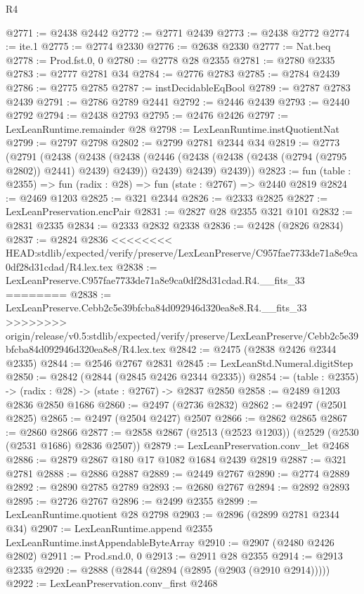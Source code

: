 \begin{lexlean}{R4}
\begin{coremodule}
{{{{{{{{{{{{{{{{{{{{{{{{{{{{{{{{{{{{{{{{{{{{{{{{{{{{{{{{{{{{{{{{{{{{{{{{{{{{{{{{{{{{{{{{{{{{@2771 := @2438 @2442
@2772 := @2771 @2439
@2773 := @2438 @2772
@2774 := ite.{1}
@2775 := @2774 @2330
@2776 := @2638 @2330
@2777 := Nat.beq
@2778 := Prod.fst.{0, 0}
@2780 := @2778 @28 @2355
@2781 := @2780 @2335
@2783 := @2777 @2781 @34
@2784 := @2776 @2783
@2785 := @2784 @2439
@2786 := @2775 @2785
@2787 := instDecidableEqBool
@2789 := @2787 @2783 @2439
@2791 := @2786 @2789 @2441
@2792 := @2446 @2439
@2793 := @2440 @2792
@2794 := @2438 @2793
@2795 := @2476 @2426
@2797 := LexLeanRuntime.remainder @28
@2798 := LexLeanRuntime.instQuotientNat
@2799 := @2797 @2798
@2802 := @2799 @2781 @2344 @34
@2819 := @2773
    (@2791
      (@2438
        (@2438
          (@2438 (@2446 (@2438 (@2438 (@2438 (@2794 (@2795 @2802)) @2441) @2439) @2439)) @2439)
          @2439)
        @2439))
@2823 := fun (table : @2355) => fun (radix : @28) => fun (state : @2767) => @2440 @2819
@2824 := @2469 @1203
@2825 := @321 @2344
@2826 := @2333 @2825
@2827 := LexLeanPreservation.encPair
@2831 := @2827 @28 @2355 @321 @101
@2832 := @2831 @2335
@2834 := @2333 @2832 @2338
@2836 := @2428 (@2826 @2834)
@2837 := @2824 @2836
<<<<<<<< HEAD:stdlib/expected/verify/preserve/LexLeanPreserve/C957fae7733de71a8e9ca0df28d31cdad/R4.lex.tex
@2838 := LexLeanPreserve.C957fae7733de71a8e9ca0df28d31cdad.R4.__fits_33
========
@2838 := LexLeanPreserve.Cebb2c5e39bfcba84d092946d320ea8e8.R4.__fits_33
>>>>>>>> origin/release/v0.5:stdlib/expected/verify/preserve/LexLeanPreserve/Cebb2c5e39bfcba84d092946d320ea8e8/R4.lex.tex
@2842 := @2475 (@2838 @2426 @2344 @2335)
@2844 := @2546 @2767 @2831
@2845 := LexLeanStd.Numeral.digitStep
@2850 := @2842 (@2844 (@2845 @2426 @2344 @2335))
@2854 := (table : @2355) -> (radix : @28) -> (state : @2767) -> @2837 @2850
@2858 := @2489 @1203 @2836 @2850 @1686
@2860 := @2497 (@2736 @2832)
@2862 := @2497 (@2501 @2825)
@2865 := @2497 (@2504 @2427) @2507
@2866 := @2862 @2865
@2867 := @2860 @2866
@2877 := @2858 @2867 (@2513 (@2523 @1203)) (@2529 (@2530 (@2531 @1686) @2836 @2507))
@2879 := LexLeanPreservation.conv_let @2468
@2886 := @2879 @2867 @180 @17 @1082 @1684 @2439 @2819
@2887 := @321 @2781
@2888 := @2886 @2887
@2889 := @2449 @2767
@2890 := @2774 @2889
@2892 := @2890 @2785 @2789
@2893 := @2680 @2767
@2894 := @2892 @2893
@2895 := @2726 @2767
@2896 := @2499 @2355
@2899 := LexLeanRuntime.quotient @28 @2798
@2903 := @2896 (@2899 @2781 @2344 @34)
@2907 := LexLeanRuntime.append @2355 LexLeanRuntime.instAppendableByteArray
@2910 := @2907 (@2480 @2426 @2802)
@2911 := Prod.snd.{0, 0}
@2913 := @2911 @28 @2355
@2914 := @2913 @2335
@2920 := @2888 (@2844 (@2894 (@2895 (@2903 (@2910 @2914)))))
@2922 := LexLeanPreservation.conv_first @2468
}}}}}}}}}}}}}}}}}}}}}}}}}}}}}}}}}}}}}}}}}}}}}}}}}}}}}}}}}}}}}}}}}}}}}}}}}}}}}}}}}}}}}}}}}}}}
\end{coremodule}
\end{lexlean}
